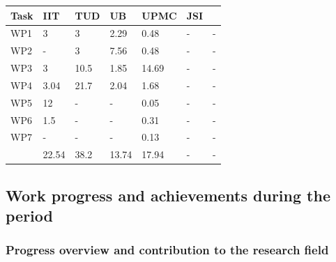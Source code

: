 \documentclass[12pt,a4paper,twoside]{article}
\begin{document}
\begin{longtable}{|C{1.5cm}|C{1.5cm}|C{1.5cm}|C{2cm}|C{2cm}|C{2cm}|C{2cm}|}
\footnotesize \textbf{Task}& \footnotesize \textbf{IIT}&\footnotesize \textbf{TUD}&\footnotesize \textbf{UB}& \footnotesize \textbf{UPMC} &\footnotesize \textbf{JSI} &  \\ \hline
\footnotesize WP1 &  3          &  3   &  2.29   &  0.48   &  -   &  -   \\  \hline
\footnotesize WP2 &  -           &  3   &  7.56   &  0.48   &  -   &  -   \\  \hline
\footnotesize WP3 &  3          &  10.5   &  1.85   &  14.69   &  -   &  -   \\  \hline
\footnotesize WP4 &  3.04     &  21.7   &  2.04   &  1.68   &  -   &  -   \\  \hline
\footnotesize WP5 &  12        &  -   &  -   &  0.05   &  -   &  -   \\  \hline
\footnotesize WP6 &  1.5       &  -   &  -   &  0.31   &  -   &  -   \\  \hline
\footnotesize WP7 &  -           &  -   &  -   &  0.13   &  -   &  -   \\  \hline
{}  & 22.54 & 38.2 & 13.74 & 17.94 & - & - \\  
\end{longtable}










\subsection{Work progress and achievements during the period}

\subsubsection{Progress overview and contribution to the research field}
\end{document}
